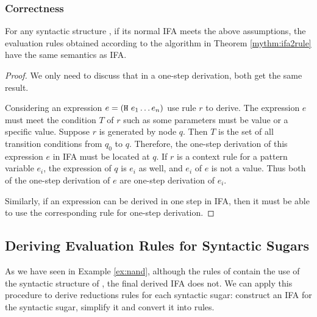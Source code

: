 \subsubsection{Correctness}

\begin{lemma}
    \label{lemma:ifa2rule-correct}
    For any syntactic structure , if its normal IFA meets the above assumptions, the evaluation rules obtained according to the algorithm in Theorem \ref{mythm:ifa2rule} have the same semantics as IFA.
\end{lemma}


\begin{proof}
    We only need to discuss that in a one-step derivation, both get the same result.

    Considering an expression $e=(\mbox{\tt H}~e_1 \ldots e_n)$ use rule $r$ to derive. The expression $e$ must meet the condition $T$ of $r$ such as some parameters must be value or a specific value. Suppose $r$ is generated by node $q$. Then $T$ is the set of all transition conditions from $q_0$ to $q$. Therefore, the one-step derivation of this expression $e$ in IFA must be located at $q$. If $r$ is a context rule for a pattern variable $e_i$, the expression of $q$ is $e_i$ as well, and $e_i$ of $e$ is not a value. Thus both of the one-step derivation of $e$ are one-step derivation of $e_i$.

    Similarly, if an expression can be derived in one step in IFA, then it must be able to use the corresponding rule for one-step derivation.
\end{proof}

\subsection{Deriving Evaluation Rules for Syntactic Sugars}

As we have seen in Example \ref{ex:nand}, although  the rules of  contain the use of the syntactic structure of , the final derived IFA does not. We can apply this procedure to derive reductions rules for each syntactic sugar: construct an  IFA for the  syntactic sugar, simplify it and convert it into rules.

